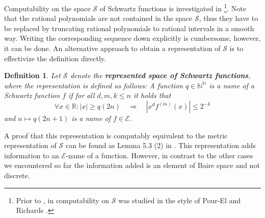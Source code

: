 \documentclass{eptcs-modified}
\newtheorem{definition}[theorem]{Definition}
\newcommand{\Baire}{{\mathbb{N}^\mathbb{N}}}
\newcommand{\demph}{\textbf}
\newcommand{\RR}{\mathbb{R}}
\newcommand{\EE}{\mathcal E}
\newcommand{\SF}{\mathcal S}
\newcommand{\abs}[1]{\left|#1\right|}
\begin{document}
			Computability on the space $\SF$ of Schwartz functions is investigated in \cite{zhong}\footnote{Prior to \cite{zhong}, in \cite{washihara} computability on $\SF$ was studied in the style of Pour-El and Richards \cite{MR1005942}.}.
			Note that the rational polynomials are not contained in the space $\SF$, thus they have to be replaced by truncating rational polynomials to rational intervals in a smooth way.
			Writing the corresponding sequence down explicitly is cumbersome, however, it can be done.
			An alternative approach to obtain a representation of $\SF$ is to effectivize the definition directly.
			\begin{definition}\label{def:schwartz representation}
				Let $\SF$ denote the \demph{represented space of Schwartz functions}, where the representation is defined as follows:
				A function $q\in\Baire$ is a name of a Schwartz function $f$ if for all $d,m,k \leq n$ it holds that
				\[ \forall x\in\RR: \abs x\geq q(2n) \quad \Rightarrow\quad\abs{x^df^{(m)}(x)}\leq2^{-k} \]
				and $n\mapsto q(2n+1)$ is a name of $f\in\EE$.
			\end{definition}
			A proof that this representation is computably equivalent to the metric representation of $\SF$ can be found as Lemma 5.3 (2) in \cite{zhong}.
			This representation adds information to an $\EE$-name of a function.
			However, in contrast to the other cases we encountered so far the information added is an element of Baire space and not discrete.
			
\end{document}
